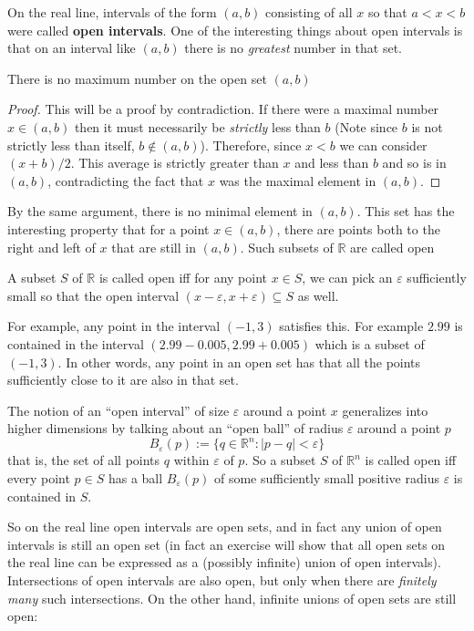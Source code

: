 	On the real line, intervals of the form $(a,b)$ consisting of all $x$ so that $a<x<b$ were called \textbf{open intervals}. One of the interesting things about open intervals is that on an interval like $(a,b)$ there is no \emph{greatest} number in that set. 
	\begin{prop}
		There is no maximum number on the open set $(a,b)$
	\end{prop} 
	\begin{proof}
		This will be a proof by contradiction. If there were a maximal number $x \in (a,b)$ then it must necessarily be \emph{strictly} less than $b$ (Note since $b$ is not strictly less than itself, $b \notin (a,b)$). Therefore, since $x<b$ we can consider $(x+b)/2$. This average is strictly greater than $x$ and less than $b$ and so is in $(a,b)$, contradicting the fact that $x$ was the maximal element in $(a,b)$.
	\end{proof}
	By the same argument, there is no minimal element in $(a,b)$. This set has the interesting property that for a point $x \in (a,b)$, there are points both to the right and left of $x$ that are still in $(a,b)$. Such subsets of $\mathbb{R}$ are called open
	
	\begin{defn}
		A subset $S$ of $\mathbb{R}$ is called open iff for any point $x \in S$, we can pick an $\varepsilon$ sufficiently small so that the open interval $(x-\varepsilon, x+\varepsilon) \subseteq S$ as well.
	\end{defn}
	For example, any point in the interval $(-1,3)$ satisfies this. For example $2.99$ is contained in the interval $(2.99 - 0.005, 2.99+0.005)$ which is a subset of  $(-1,3)$. In other words, any point in an open set has that all the points sufficiently close to it are also in that set.
	
	
	The notion of an ``open interval'' of size $\varepsilon$ around a point $x$ generalizes into higher dimensions by talking about an ``open ball'' of radius $\varepsilon$ around a point $p$
	\begin{equation}
		B_{\varepsilon} (p) := \{ q \in \mathbb{R}^n : |p-q|<\varepsilon \}
	\end{equation}
	that is, the set of all points $q$ within $\varepsilon$ of $p$. So a subset $S$ of $\mathbb{R}^n$ is called open iff every point $p \in S$ has a ball $B_\varepsilon(p)$ of some sufficiently small positive radius $\varepsilon$ is contained in $S$.
	
	So on the real line open intervals are open sets, and in fact any union of open intervals is still an open set (in fact an exercise will show that all open sets on the real line can be expressed as a (possibly infinite) union of open intervals). Intersections of open intervals are also open, but only when there are \emph{finitely many} such intersections. On the other hand, infinite unions of open sets are still open:
	
